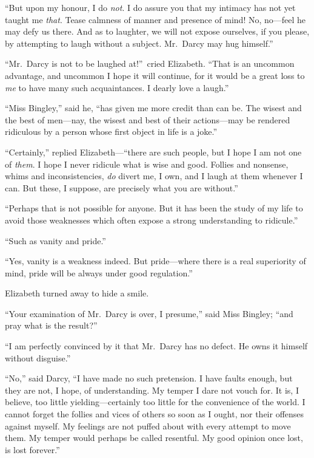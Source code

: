 \documentclass[12pt,english,oneside]{book}
\begin{document}
{}``But upon my honour, I do \textit{not}. I do assure you that my
intimacy has not yet taught me \textit{that}. Tease calmness of manner
and presence of mind! No, no\mbox{---}feel he may defy us there.
And as to laughter, we will not expose ourselves, if you please, by
attempting to laugh without a subject. Mr.\ Darcy may hug himself.''

{}``Mr.\ Darcy is not to be laughed at!''\ cried Elizabeth. {}``That
is an uncommon advantage, and uncommon I hope it will continue, for
it would be a great loss to \textit{me} to have many such acquaintances.
I dearly love a laugh.''

{}``Miss Bingley,'' said he, {}``has given me more credit than
can be. The wisest and the best of men\mbox{---}nay, the wisest and
best of their actions\mbox{---}may be rendered ridiculous by a person
whose first object in life is a joke.''

{}``Certainly,'' replied Elizabeth\mbox{---}{}``there are such
people, but I hope I am not one of \textit{them}. I hope I never ridicule
what is wise and good. Follies and nonsense, whims and inconsistencies,
\textit{do} divert me, I own, and I laugh at them whenever I can.
But these, I suppose, are precisely what you are without.''

{}``Perhaps that is not possible for anyone. But it has been the
study of my life to avoid those weaknesses which often expose a strong
understanding to ridicule.''

{}``Such as vanity and pride.''

{}``Yes, vanity is a weakness indeed. But pride\mbox{---}where there
is a real superiority of mind, pride will be always under good regulation.''

Elizabeth turned away to hide a smile.

{}``Your examination of Mr.\ Darcy is over, I presume,'' said Miss
Bingley; {}``and pray what is the result?''\ 

{}``I am perfectly convinced by it that Mr.\ Darcy has no defect.
He owns it himself without disguise.''

{}``No,'' said Darcy, {}``I have made no such pretension. I have
faults enough, but they are not, I hope, of understanding. My temper
I dare not vouch for. It is, I believe, too little yielding\mbox{---}certainly
too little for the convenience of the world. I cannot forget the follies
and vices of others so soon as I ought, nor their offenses against
myself. My feelings are not puffed about with every attempt to move
them. My temper would perhaps be called resentful. My good opinion
once lost, is lost forever.''
\end{document}
